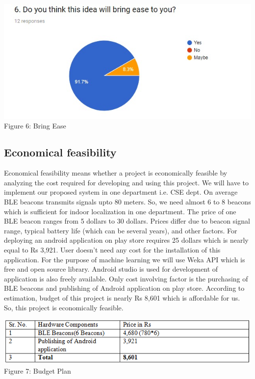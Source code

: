 \documentclass{article}
\begin{document}
\begin{center}
\includegraphics[scale=0.7]{graph6}
\\Figure 6: Bring Ease
\end{center}

 

\subsection{Economical feasibility}

Economical feasibility means whether a project is economically feasible by analyzing the cost required for developing and using this project. We will have to implement our proposed system in one department i.e. CSE dept. On average BLE beacons transmits signals upto 80 meters. So, we need almost 6 to 8 beacons which is sufficient for indoor localization in one department. The price of one BLE beacon ranges from 5 dollars to 30 dollars. Prices differ due to beacon signal range, typical battery life (which can be several years), and other factors. For deploying an android application on play store requires 25 dollars which is nearly equal to Rs 3,921. User doesn't need any cost for the installation of this application. For the purpose of machine learning we will use Weka API which is free and open source library. Android studio is used for development of application is also freely available. Only cost
involving factor is the purchasing of BLE beacons\cite{belmonte2017indoor} and publishing of Android application on play store. According to estimation, budget of this project is nearly Rs 8,601 which is affordable for us. So, this project is economically feasible.

\begin{center}
\includegraphics[scale=0.8]{table3}
\\Figure 7: Budget Plan
\end{center}
\end{document}
